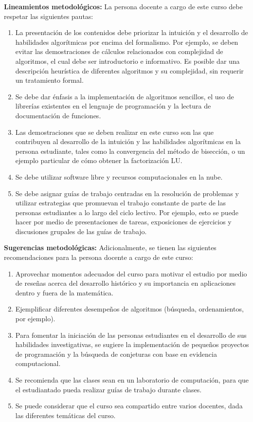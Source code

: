 \begin{refsection}
\noindent \textbf{Lineamientos metodológicos:} La persona docente a cargo de este curso debe respetar las siguientes pautas:
\begin{enumerate}
    \item La presentación de los contenidos debe priorizar la intuición y el desarrollo de habilidades algorítmicas por encima del formalismo. Por ejemplo, se deben evitar las demostraciones de cálculos relacionados con complejidad de algoritmos, el cual debe ser introductorio e informativo. Es posible dar una descripción heurística de diferentes algoritmos y su complejidad, sin requerir un tratamiento formal.
    \item Se debe dar énfasis a la implementación de algoritmos sencillos, el uso de librerías existentes en el lenguaje de programación y la lectura de documentación de funciones.
    \item Las demostraciones que se deben realizar en este curso son las que contribuyen al desarrollo de la intuición y las habilidades algorítmicas en la persona estudiante, tales como la convergencia del método de bisección, o un ejemplo particular de cómo obtener la factorización LU.
    \item Se debe utilizar software libre y recursos computacionales en la nube.
    \item Se debe asignar guías de trabajo centradas en la resolución de problemas y utilizar estrategias  que promuevan el trabajo constante de parte de las personas estudiantes a lo largo del ciclo lectivo. Por ejemplo, esto se puede hacer por medio de presentaciones de tareas, exposiciones de ejercicios y discusiones grupales de las guías de trabajo.
\end{enumerate}

\textbf{Sugerencias metodológicas:} Adicionalmente, se tienen las siguientes recomendaciones para la persona docente a cargo de este curso:
\begin{enumerate}
    \item Aprovechar momentos adecuados del curso para motivar el estudio por medio de reseñas acerca del desarrollo histórico  y su importancia en aplicaciones dentro y fuera de la matemática.
    \item Ejemplificar diferentes desempeños de algoritmos (búsqueda, ordenamientos, por ejemplo).
    \item Para fomentar la iniciación de las personas estudiantes en el desarrollo de sus habilidades investigativas, se sugiere la implementación de pequeños proyectos de programación y la búsqueda de conjeturas con base en evidencia computacional.%
    \item Se recomienda que las clases sean en un laboratorio de computación, para que el estudiantado pueda realizar guías de trabajo durante clases.
    \item Se puede considerar que el curso sea compartido entre varios docentes, dada las diferentes temáticas del curso.
\end{enumerate}


\end{refsection}
